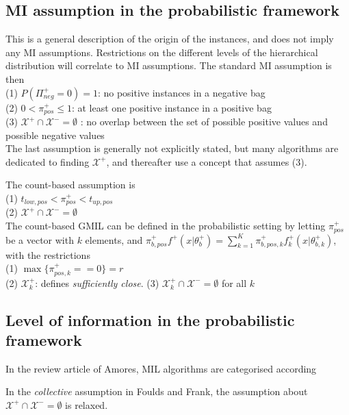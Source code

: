 \subsection{MI assumption in the probabilistic framework}
This is a general description of the origin of the instances, and does not imply any MI assumptions. 
Restrictions on the different levels of the hierarchical distribution will correlate to MI assumptions.
The standard MI assumption is then \\
(1) $P(\Pi^+_{neg} = 0) = 1$: no positive instances in a negative bag\\
(2) $0<\pi^+_{pos} \leq 1$: at least one positive instance in a positive bag\\
(3) $\mathcal{X}^+ \cap \mathcal{X}^- = \emptyset$ : no overlap between the set of possible positive values and possible negative values \\
The last assumption is generally not explicitly stated, but many algorithms are dedicated to finding $\mathcal{X}^+$, and thereafter use a concept that assumes (3). 

The count-based assumption is\\
(1) $t_{low,pos} < \pi^+_{pos} < t_{up,pos}$ \\
(2) $\mathcal{X}^+ \cap \mathcal{X}^- = \emptyset$ \\

The count-based GMIL can be defined in the probabilistic setting by letting $\pi^+_{pos}$ be a vector with $k$ elements, and $\pi^+_{b,pos} f^+(x|\theta_b^+) = \sum_{k = 1}^K \pi^+_{b,pos,k} f^+_k(x|\theta_{b,k}^+)$, with the restrictions\\
(1) $\max \{\pi^+_{pos,k} == 0\} = r$ \\
(2) $\mathcal{X}^+_k$: defines {\it sufficiently close}. 
(3) $\mathcal{X}^+_k \cap \mathcal{X}^- = \emptyset$ for all $k$ \\

\subsection{Level of information in the probabilistic framework}
In the review article of Amores, MIL algorithms are categorised according 


In the {\it collective} assumption in Foulds and Frank, the assumption about $\mathcal{X}^+ \cap \mathcal{X}^- = \emptyset$ is relaxed.











